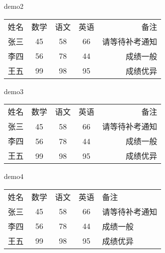\documentclass[UTF8]{ctexart}
\begin{document}
    demo2

    \begin{tabular}{l|c c c |r}
        \hline
        姓名 & 数学 & 语文 & 英语 & 备注
    \\  张三 & 45 & 58 & 66 & 请等待补考通知
    \\  李四 & 56 & 78 & 44 & 成绩一般
    \\  王五 & 99 & 98 & 95 & 成绩优异
    \\  \hline
    \end{tabular}

    demo3

    \begin{tabular}{l||c c c||r}
        \hline \hline
        姓名 & 数学 & 语文 & 英语 & 备注
    \\  张三 & 45 & 58 & 66 & 请等待补考通知
    \\  李四 & 56 & 78 & 44 & 成绩一般
    \\  王五 & 99 & 98 & 95 & 成绩优异
    \\  \hline \hline
    \end{tabular}

    demo4

    \begin{tabular}{l|c|c|c|p{2cm}}
        姓名 & 数学 & 语文 & 英语 & 备注
    \\  张三 & 45 & 58 & 66 & 请等待补考通知
    \\  李四 & 56 & 78 & 44 & 成绩一般
    \\  王五 & 99 & 98 & 95 & 成绩优异
    \end{tabular}
\end{document}
